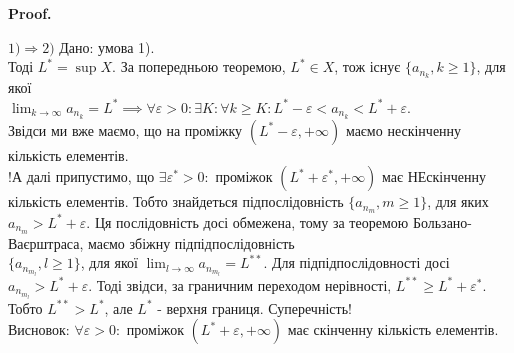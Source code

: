 \documentclass[a4paper, 14pt]{article}
\makeatletter
\def\qed{$\blacksquare$}
\theoremstyle{theoremdd}
\theoremstyle{theoremdd}
\theoremstyle{theoremdd}
\theoremstyle{theoremdd}
\theoremstyle{theoremdd}
\theoremstyle{theoremdd}
\theoremstyle{theoremdd}
\theoremstyle{theoremdd}
\renewenvironment{proof}[1][Proof.\\]{\par
\pushQED{\hfill \qed}%
\normalfont \topsep6\p@\@plus6\p@\relax
\trivlist
\item\relax
{\bfseries
#1\@addpunct{.}}\hspace\labelsep\ignorespaces
}{%
\popQED\endtrivlist\@endpefalse
}
\makeatother
\begin{document}
	\begin{proof}
	$\boxed{1) \Rightarrow 2)}$ Дано: умова 1).\\
	Тоді $L^* = \displaystyle \sup X$. За попередньою теоремою, $L^* \in X$, тож існує $\{a_{n_k}, k \geq 1\}$, для якої \\ $\displaystyle \lim_{k \to \infty} a_{n_k} = L^* \implies \forall \varepsilon > 0: \exists K: \forall k \geq K: L^*-\varepsilon < a_{n_k} < L^*+\varepsilon$.\\
	Звідси ми вже маємо, що на проміжку $(L^*-\varepsilon, +\infty)$ маємо нескінченну кількість елементів.\\
	!А далі припустимо, що $\exists \varepsilon^* > 0:$ проміжок $(L^*+\varepsilon^*, + \infty)$ має НЕскінченну кількість елементів. Тобто знайдеться підпослідовність $\{a_{n_m}, m \geq 1\}$, для яких $a_{n_m} > L^*+\varepsilon$. Ця послідовність досі обмежена, тому за теоремою Бользано-Ваєрштраса, маємо збіжну підпідпослідовність \\ $\{a_{n_{m_l}}, l \geq 1\}$, для якої $\displaystyle\lim_{l \to \infty} a_{n_{m_l}} = L^{**}$. Для підпідпослідовності досі $a_{n_{m_l}} > L^* + \varepsilon$. Тоді звідси, за граничним переходом нерівності, $L^{**} \geq L^* + \varepsilon^*$. Тобто $L^{**} > L^*$, але $L^*$ - верхня границя. Суперечність!\\
	Висновок: $\forall \varepsilon > 0:$ проміжок $(L^*+\varepsilon, + \infty)$ має скінченну кількість елементів.
	\bigskip \\
	

\end{proof}
\end{document}
